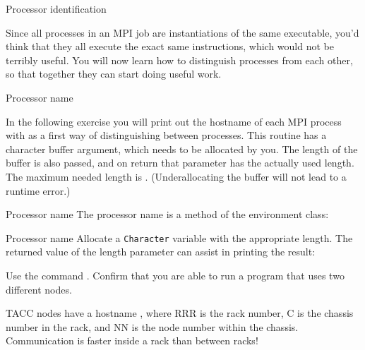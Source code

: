 
 {Processor identification}
\label{sec:rank-size}

Since all processes in an MPI job are instantiations of the same executable,
you'd think that they all execute the exact same instructions,
which would not be terribly useful.
You will now learn how to distinguish
processes from each other, so that together they can start doing
useful work.

 {Processor name}

In the following exercise you will print out the hostname 
of each MPI process
%
with
%
as a first way of distinguishing between processes.
This routine has a character buffer argument, which
needs to be allocated by you.
The length of the buffer is also passed,
and on return that parameter has the actually used length.
The maximum needed length is .
%
%
(Underallocating the buffer will not lead to a runtime error.)

\begin{mplnote}{Processor name}
  The processor name is a method of the environment class:
\end{mplnote}

\begin{fortrannote}{Processor name}
  Allocate a \lstinline{Character} variable with
  the appropriate length.
  The returned value of the length parameter can assist 
  in printing the result:

\end{fortrannote}

\begin{exercise}
  \label{ex:procname}
  Use the command .
  Confirm that you are able to run a program that uses two different nodes.

\begin{tacc}
    TACC nodes have a hostname , where RRR is the rack number, C is the chassis
    number in the rack, and NN is the node number within the chassis. Communication
    is faster inside a rack than between racks!
\end{tacc}
\end{exercise}

